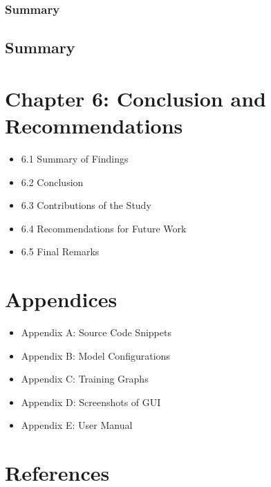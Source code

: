 \documentclass[
  12pt,
  oneside]{article}
\providecommand{\tightlist}{%
  \setlength{\itemsep}{0pt}\setlength{\parskip}{0pt}}
\begin{document}
\subsubsection{Summary}\label{summary-2}

\subsection{Summary}\label{summary-3}

\newpage

\section{Chapter 6: Conclusion and
Recommendations}\label{chapter-6-conclusion-and-recommendations}

\begin{itemize}
\tightlist
\item
  6.1 Summary of Findings
\item
  6.2 Conclusion
\item
  6.3 Contributions of the Study
\item
  6.4 Recommendations for Future Work
\item
  6.5 Final Remarks
\end{itemize}

\newpage

\section{Appendices}\label{appendices}

\begin{itemize}
\tightlist
\item
  Appendix A: Source Code Snippets
\item
  Appendix B: Model Configurations
\item
  Appendix C: Training Graphs
\item
  Appendix D: Screenshots of GUI
\item
  Appendix E: User Manual
\end{itemize}

\newpage

\section*{References}\label{references}
\end{document}
